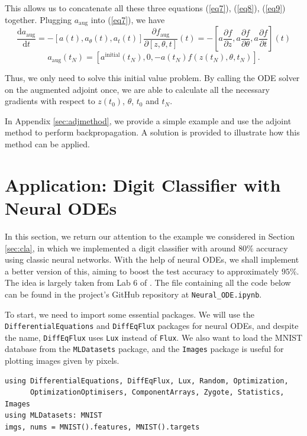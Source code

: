 \documentclass[a4paper,11pt,titlepage]{article}
\theoremstyle{definition}
\theoremstyle{plain}
\theoremstyle{remark}
\begin{document}
This allows us to concatenate all these three equations (\ref{eq7}), (\ref{eq8}), (\ref{eq9}) together. Plugging $a_{\mathrm{aug}}$ into (\ref{eq7}), we have
$$
\frac{\mathrm{d}a_{\mathrm{aug}}}{\mathrm{d}t} = -[a(t), a_\theta(t), a_t(t)]\frac{\partial f_{\mathrm{aug}}}{\partial [z,\theta,t]}(t)=-\left[a\frac{\partial f}{\partial z},a\frac{\partial f}{\partial \theta},a\frac{\partial f}{\partial t}\right](t)
$$
$$
a_{\mathrm{aug}}(t_N)=\left[a^{\mathrm{initial}}(t_N),0,-a(t_N)f(z(t_N),\theta, t_N)\right].
$$

Thus, we only need to solve this initial value problem. By calling the ODE solver on the augmented adjoint once, we are able to calculate all the necessary gradients with respect to $z(t_0)$, $\theta$, $t_0$ and $t_N$.

In Appendix \ref{sec:adjmethod}, we provide a simple example and use the adjoint method to perform backpropagation. A solution is provided to illustrate how this method can be applied.

\pagebreak
\section{Application: Digit Classifier with Neural ODEs}
\label{sec:app}

In this section, we return our attention to the example we considered in Section \ref{sec:cla}, in which we implemented a digit classifier with around $80\%$ accuracy using classic neural networks. With the help of neural ODEs, we shall implement a better version of this, aiming to boost the test accuracy to approximately $95\%$. The idea is largely taken from Lab 6 of \cite{SciMLSANUM2024}. The file containing all the code below can be found in the project's GitHub repository at \verb|Neural_ODE.ipynb|.

To start, we need to import some essential packages. We will use the \verb|DifferentialEquations| and \verb|DiffEqFlux| packages for neural ODEs, and despite the name, \verb|DiffEqFlux| uses \verb|Lux| instead of \verb|Flux|. We also want to load the MNIST database from the \verb|MLDatasets| package, and the \verb|Images| package is useful for plotting images given by pixels.

\begin{verbatim}
using DifferentialEquations, DiffEqFlux, Lux, Random, Optimization,
      OptimizationOptimisers, ComponentArrays, Zygote, Statistics, Images
using MLDatasets: MNIST
imgs, nums = MNIST().features, MNIST().targets
\end{verbatim}
\end{document}
